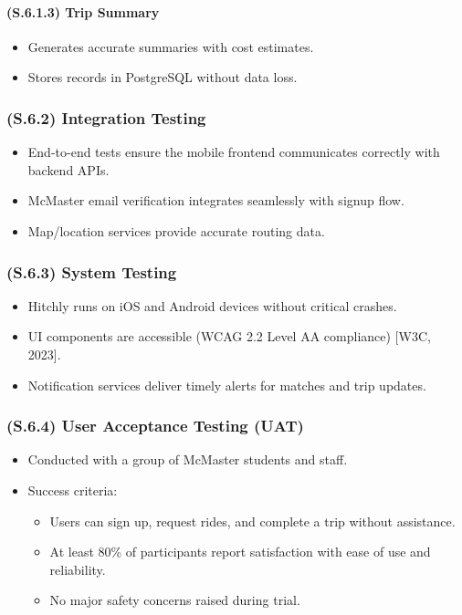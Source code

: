 \documentclass[12pt,letterpaper]{article}
\begin{document}
\paragraph{(S.6.1.3) Trip Summary} %
\begin{itemize}
    \item Generates accurate summaries with cost estimates.
    \item Stores records in PostgreSQL without data loss.
\end{itemize}

\subsubsection{(S.6.2) Integration Testing} %
\begin{itemize}
    \item End-to-end tests ensure the mobile frontend communicates correctly with backend APIs.
    \item McMaster email verification integrates seamlessly with signup flow.
    \item Map/location services provide accurate routing data.
\end{itemize}

\subsubsection{(S.6.3) System Testing} %
\begin{itemize}
    \item Hitchly runs on iOS and Android devices without critical crashes.
  \item UI components are accessible (WCAG 2.2 Level AA compliance) [W3C, 2023].
    \item Notification services deliver timely alerts for matches and trip updates.
\end{itemize}

\subsubsection{(S.6.4) User Acceptance Testing (UAT)} %
\begin{itemize}
    \item Conducted with a group of McMaster students and staff.
    \item Success criteria:
    \begin{itemize}
        \item Users can sign up, request rides, and complete a trip without assistance.
        \item At least 80\% of participants report satisfaction with ease of use and reliability.
        \item No major safety concerns raised during trial.
    \end{itemize}
\end{itemize}
\end{document}
